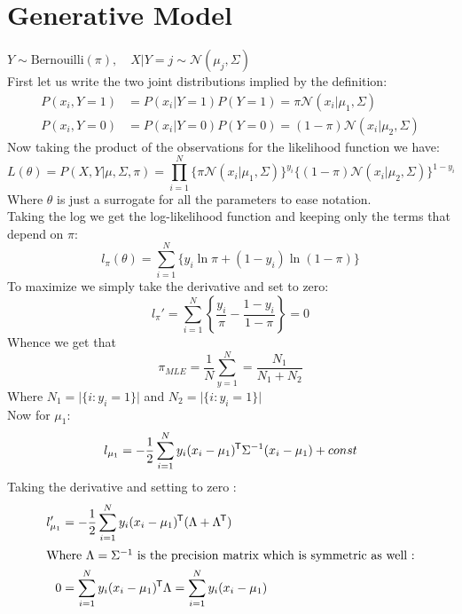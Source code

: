 


\newcommand{\No}{\mathcal{N}}

\section{Generative Model}
$Y \sim \mathrm{Bernouilli}(\pi), \quad X\vert Y = j \sim \mathcal N (\mu_j, \Sigma)$\\[1ex]
First let us write the two joint distributions implied by the definition:
\begin{align*}
    P(x_i, Y = 1) &= P(x_i \vert Y = 1)P(Y=1) = \pi\No(x_i \vert \mu_1, \Sigma)\\
    P(x_i ,Y = 0) &= P(x_i \vert Y = 0)P(Y=0) = (1-\pi) \No (x_i \vert \mu_2, \Sigma)
\end{align*}
Now taking the product of the observations for the likelihood function we have:
\begin{equation}
    L(\theta) =  P(X, Y \vert \mu, \Sigma , \pi) = \prod_{i=1}^{N}
    	\{\pi\No (x_i \vert \mu_1, \Sigma)\}^{y_i}
	\{(1-\pi)\No (x_i \vert \mu_2, \Sigma)\}^{1-y_i}
\end{equation}
Where $\theta$ is just a surrogate for all the parameters to ease notation.\\
Taking the log we get the log-likelihood function and keeping only the terms 
that depend on $\pi$:
\begin{equation}
l_\pi (\theta) = \sum_{i=1}^{N}\{y_i\ln \pi + (1-y_i)\ln (1-\pi) \}
\end{equation}
To maximize we simply take the derivative and set to zero:
\begin{equation}
l_\pi ' = \sum_{i=1}^{N}\left \{\frac{y_i}{\pi}  - \frac{1-y_i}{1-\pi}\right \}  = 0
\end{equation}
Whence we get that 
\begin{equation}
\pi_{MLE} = \frac{1}{N}\sum_{y=1}^N = \frac{N_1}{N_1 + N_2}
\end{equation}
Where $N_1 = \vert \{i : y_i = 1\}\vert$ and $N_2 = \vert \{i : y_i = 1\}\vert$\\
Now for $\mu_1$:
\begin{equation}
    l_{\mu_1} = -\frac{1}{2}\sum_{i=1}^N y_i (x_i - \mu_1)^{\mkern-1.5mu\mathsf{T}} \Sigma^{-1}(x_i
    - \mu_1) + const 
\end{equation}
%
Taking the derivative and setting to zero :
\begin{align*}
    l_{\mu_1}' &= -\frac{1}{2} \sum_{i=1}^N y_i (x_i-\mu_1)^{\mkern-1.5mu\mathsf{T}}(\Lambda + \Lambda^{\mkern-1.5mu\mathsf{T}})\\
    \intertext{Where $\Lambda = \Sigma^{-1}$ is the precision matrix which is symmetric
    as well :}
    0 &= \sum_{i=1}^N y_i (x_i-\mu_1)^{\mkern-1.5mu\mathsf{T}} \Lambda 
        =\sum_{i=1}^N y_i (x_i-\mu_1)
\end{align*}
